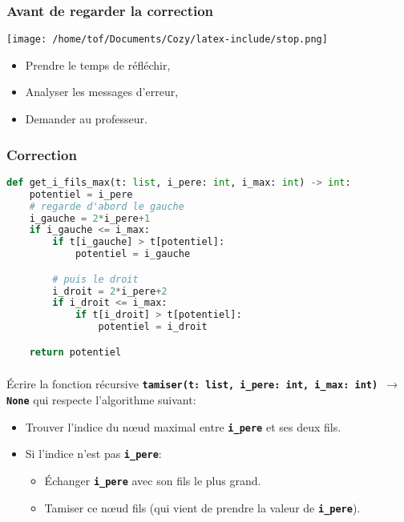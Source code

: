 \documentclass[svgnames,11pt]{beamer}
\begin{document}
\begin{frame}
    \frametitle{Avant de regarder la correction}
    \begin{center}
        \centering
        \texttt{[image: /home/tof/Documents/Cozy/latex-include/stop.png]}
    \end{center}
    {\Large
    \begin{itemize}
        \item Prendre le temps de réfléchir,
        \item Analyser les messages d'erreur,
        \item Demander au professeur.
    \end{itemize}
    }
\end{frame}
\begin{frame}[fragile]
    \frametitle{Correction}

    \begin{center}
        \begin{lstlisting}[language=Python , basicstyle=\ttfamily\small, xleftmargin=.3em, xrightmargin=-5em]
def get_i_fils_max(t: list, i_pere: int, i_max: int) -> int:
    potentiel = i_pere
    # regarde d'abord le gauche
    i_gauche = 2*i_pere+1
    if i_gauche <= i_max:
        if t[i_gauche] > t[potentiel]:
            potentiel = i_gauche

        # puis le droit
        i_droit = 2*i_pere+2
        if i_droit <= i_max:
            if t[i_droit] > t[potentiel]:
                potentiel = i_droit

    return potentiel
\end{lstlisting}
    \end{center}

\end{frame}
\begin{frame}
    \frametitle{}

    \begin{activite}
        Écrire la fonction récursive \textbf{\texttt{tamiser(t: list, i\_pere: int, i\_max: int) $\rightarrow$ None}} qui respecte l'algorithme suivant:
        \begin{itemize}
            \item Trouver l'indice du nœud maximal entre \textbf{\texttt{i\_pere}} et ses deux fils.
            \item Si l'indice n'est pas \textbf{\texttt{i\_pere}}:
                  \begin{itemize}
                      \item Échanger \textbf{\texttt{i\_pere}} avec son fils le plus grand.
                      \item Tamiser ce nœud fils (qui vient de prendre la valeur de \textbf{\texttt{i\_pere}}).
                  \end{itemize}
        \end{itemize}
    \end{activite}

\end{frame}
\end{document}
